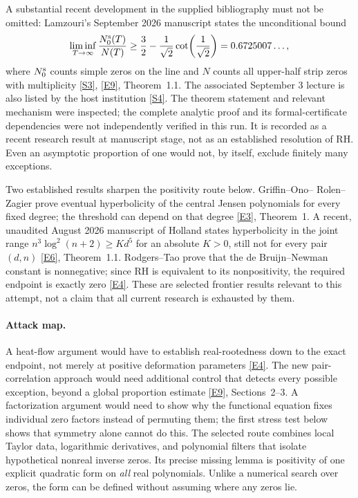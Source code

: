 \documentclass[11pt]{article}
\newcommand{\sref}[2]{\hyperlink{source:#1:#2}{[S#2]}}
\newcommand{\eref}[2]{\hyperlink{extra:#1:#2}{[E#2]}}
\begin{document}
A substantial recent development in the supplied bibliography must not be
omitted: Lamzouri's September 2026 manuscript states the unconditional bound
\[
 \liminf_{T\to\infty}\frac{N_0^{\rm s}(T)}{N(T)}
 \ge \frac32-\frac1{\sqrt2}\cot\!\left(\frac1{\sqrt2}\right)
 =0.6725007\ldots,
\]
where $N_0^{\rm s}$ counts simple zeros on the line and $N$ counts all upper-half
strip zeros with multiplicity \sref{2}{3}, \eref{2}{9}, Theorem~1.1.
The associated September 3 lecture is also listed by the host institution
\sref{2}{4}. The theorem statement and relevant mechanism were inspected;
the complete analytic proof and its formal-certificate dependencies were not
independently verified in this run. It is recorded as a recent research result
at manuscript stage, not as an established resolution of RH. Even an
asymptotic proportion of one would not, by itself, exclude finitely many
exceptions.

Two established results sharpen the positivity route below. Griffin--Ono--
Rolen--Zagier prove eventual hyperbolicity of the central Jensen polynomials
for every fixed degree; the threshold can depend on that degree
\eref{2}{3}, Theorem~1. A recent, unaudited August 2026 manuscript of Holland
states hyperbolicity in the joint range $n^3\log^2(n+2)\ge Kd^5$ for an absolute
$K>0$, still not for every pair $(d,n)$ \eref{2}{6}, Theorem~1.1.
Rodgers--Tao prove that the de Bruijn--Newman constant is nonnegative; since
RH is equivalent to its nonpositivity, the required endpoint is exactly zero
\eref{2}{4}. These are selected frontier results relevant to this attempt,
not a claim that all current research is exhausted by them.

\paragraph{Attack map.}
A heat-flow argument would have to establish real-rootedness down to the exact
endpoint, not merely at positive deformation parameters \eref{2}{4}.
The new pair-correlation approach would need additional control that detects
every possible exception, beyond a global proportion estimate
\eref{2}{9}, Sections~2--3. A factorization argument would need to show why the
functional equation fixes individual zero factors instead of permuting them;
the first stress test below shows that symmetry alone cannot do this.
The selected route combines local Taylor data, logarithmic derivatives,
and polynomial filters that isolate hypothetical nonreal inverse zeros.
Its precise missing lemma is positivity of one explicit quadratic form on
\emph{all} real polynomials. Unlike a numerical search over zeros, the form
can be defined without assuming where any zeros lie.
\end{document}
